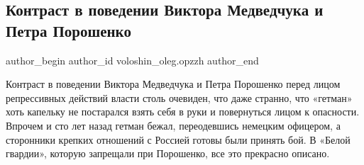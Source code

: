  
 
 
 
 
 
\subsection{Контраст в поведении Виктора Медведчука и Петра Порошенко}
\label{sec:18_12_2021.fb.voloshin_oleg.opzzh.1.poroshenko_povestka}
 
\ifcmt
 author_begin
   author_id voloshin_oleg.opzzh
 author_end
\fi

Контраст в поведении Виктора Медведчука и Петра Порошенко перед лицом
репрессивных действий власти столь очевиден, что даже странно, что «гетман»
хоть капельку не постарался взять себя в руки и повернуться лицом к опасности.
Впрочем и сто лет назад гетман бежал, переодевшись немецким офицером, а
сторонники крепких отношений с Россией готовы были принять бой. В «Белой
гвардии», которую запрещали при Порошенко, все это прекрасно описано.

